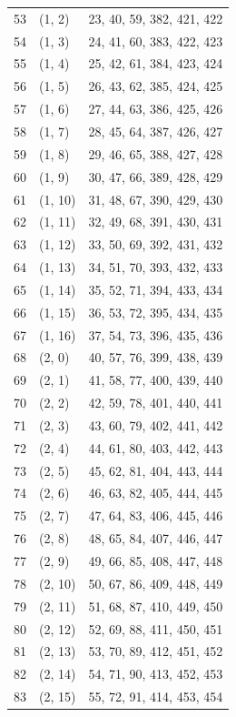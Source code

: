 \documentclass{article}
\begin{document}
\begin{longtable}{lll}
  53 & (1, 2) & 23, 40, 59, 382, 421, 422 \\
  54 & (1, 3) & 24, 41, 60, 383, 422, 423 \\
  55 & (1, 4) & 25, 42, 61, 384, 423, 424 \\
  56 & (1, 5) & 26, 43, 62, 385, 424, 425 \\
  57 & (1, 6) & 27, 44, 63, 386, 425, 426 \\
  58 & (1, 7) & 28, 45, 64, 387, 426, 427 \\
  59 & (1, 8) & 29, 46, 65, 388, 427, 428 \\
  60 & (1, 9) & 30, 47, 66, 389, 428, 429 \\
  61 & (1, 10) & 31, 48, 67, 390, 429, 430 \\
  62 & (1, 11) & 32, 49, 68, 391, 430, 431 \\
  63 & (1, 12) & 33, 50, 69, 392, 431, 432 \\
  64 & (1, 13) & 34, 51, 70, 393, 432, 433 \\
  65 & (1, 14) & 35, 52, 71, 394, 433, 434 \\
  66 & (1, 15) & 36, 53, 72, 395, 434, 435 \\
  67 & (1, 16) & 37, 54, 73, 396, 435, 436 \\
  68 & (2, 0) & 40, 57, 76, 399, 438, 439 \\
  69 & (2, 1) & 41, 58, 77, 400, 439, 440 \\
  70 & (2, 2) & 42, 59, 78, 401, 440, 441 \\
  71 & (2, 3) & 43, 60, 79, 402, 441, 442 \\
  72 & (2, 4) & 44, 61, 80, 403, 442, 443 \\
  73 & (2, 5) & 45, 62, 81, 404, 443, 444 \\
  74 & (2, 6) & 46, 63, 82, 405, 444, 445 \\
  75 & (2, 7) & 47, 64, 83, 406, 445, 446 \\
  76 & (2, 8) & 48, 65, 84, 407, 446, 447 \\
  77 & (2, 9) & 49, 66, 85, 408, 447, 448 \\
  78 & (2, 10) & 50, 67, 86, 409, 448, 449 \\
  79 & (2, 11) & 51, 68, 87, 410, 449, 450 \\
  80 & (2, 12) & 52, 69, 88, 411, 450, 451 \\
  81 & (2, 13) & 53, 70, 89, 412, 451, 452 \\
  82 & (2, 14) & 54, 71, 90, 413, 452, 453 \\
  83 & (2, 15) & 55, 72, 91, 414, 453, 454 \\

\end{longtable}
\end{document}

